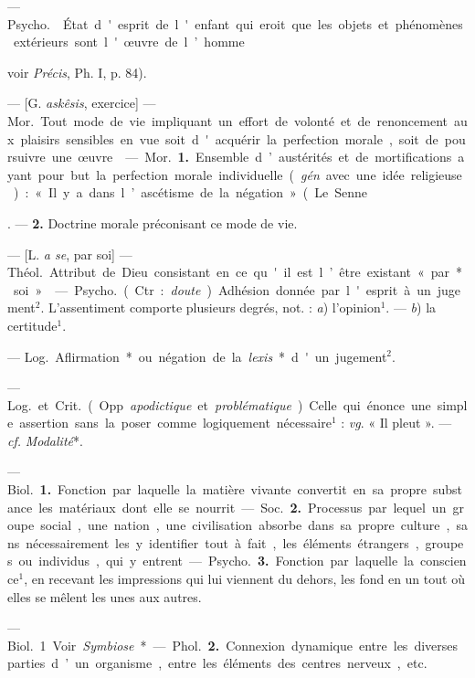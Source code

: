 \begin{itemize}[leftmargin=1cm, label=, itemsep=1pt]
{{{{ — \si{Psycho.}  État d'esprit
de l'enfant qui eroit que les objets
et phénomènes extérieurs sont l'œuvre de l’homme {voir {\it Précis}, Ph. I,
p. 84).

 — [G. {\it askêsis}, exercice] — \si{Mor.}
Tout mode de vie impliquant un
effort de volonté et de renoncement
aux plaisirs sensibles en vue soit
d'acquérir la perfection morale, soit
de poursuivre une œuvre.

 — \si{Mor.} {\bf 1.} Ensemble d’austérités et de mortifications ayant
pour but la perfection morale individuelle ({\it gén}. avec une idée
religieuse) : « Il y a dans l’ascétisme de
la négation » (Le Senne}. — {\bf 2.} 
Doctrine morale préconisant ce
mode de vie.

 — [L. {\it a se}, par soi] — \si{Théol.}
Attribut de Dieu consistant en ce
qu'il est l’être existant « par* soi ».

 — \si{Psycho.} (Ctr. : {\it doute}).
Adhésion donnée par l'esprit à un
jugement$^2$. L’assentiment comporte
plusieurs degrés, not. : {\it a}) l'opinion$^1$.
— {\it b}) la certitude$^1$.

 — \si{Log.} Aflirmation* ou
négation de la {\it lexis}* d'un jugement$^2$.

 — \si{Log.}
et \si{Crit.} (Opp. {\it apodictique} et {\it problématique}). Celle qui énonce une
simple assertion sans la poser comme
logiquement nécessaire$^1$ : {\it vg}. « Il
pleut ». — {\it cf.}  {\it Modalité}*.


 — \si{Biol.} {\bf 1.} Fonction
par laquelle la matière vivante convertit en sa propre substance les
matériaux dont elle se nourrit.

— \si{Soc.} {\bf 2.} Processus par lequel un
groupe social, une nation, une civilisation absorbe dans sa propre
culture, sans nécessairement les y identifier tout à fait,
les éléments étrangers, groupes ou individus, qui y
entrent.

— \si{Psycho.} {\bf 3.} Fonction par laquelle la conscience$^1$, en recevant
les impressions qui lui viennent du
dehors, les fond en un tout où elles
se mêlent les unes aux autres.


 — \si{Biol.} 1 Voir {\it Symbiose}*.

— \si{Phol.} {\bf 2.} Connexion dynamique
entre les diverses parties d’un organisme, entre les éléments des centres
nerveux, etc.

}}}}
\end{itemize}
